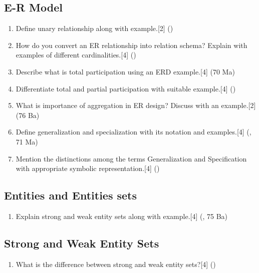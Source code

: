 \documentclass[12pt]{article}
\begin{document}
    \subsection{E-R Model}
    \begin{enumerate}
    \item Define unary relationship along with example.\hfill[2] ()

    \item How do you convert an ER relationship into relation schema? Explain with examples of different cardinalities.\hfill[4] ()

    \item Describe what is total participation using an ERD example.\hfill[4] (70 Ma)

    \item Differentiate total and partial participation with suitable example.\hfill[4] ()

    \item What is importance of aggregation in ER design? Discuss with an example.\hfill[2] (76 Ba)

    \item Define generalization and specialization with its notation and examples.\hfill[4] (, 71 Ma)

    \item Mention the distinctions among the terms Generalization and Specification with appropriate symbolic representation.\hspace{11.9cm}[4] ()

    \end{enumerate}
    \subsection{Entities and Entities sets}
    \begin{enumerate}
    \item Explain strong and weak entity sets along with example.\hfill[4] (, 75 Ba)
    \end{enumerate}
    \subsection{Strong and Weak Entity Sets}
    \begin{enumerate}
    \item What is the difference between strong and weak entity sets?\hfill[4] ()
    \end{enumerate}
\end{document}
